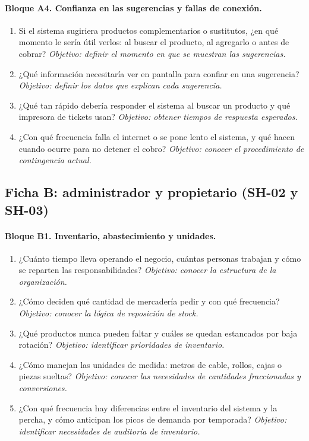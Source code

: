 \paragraph{Bloque A4. Confianza en las sugerencias y fallas de conexión.}
\begin{enumerate}[label=A4.\arabic*, leftmargin=*]
\item Si el sistema sugiriera productos complementarios o sustitutos, ¿en qué momento le sería útil verlos: al buscar el producto, al agregarlo o antes de cobrar? \emph{Objetivo: definir el momento en que se muestran las sugerencias.}
\item ¿Qué información necesitaría ver en pantalla para confiar en una sugerencia? \emph{Objetivo: definir los datos que explican cada sugerencia.}
\item ¿Qué tan rápido debería responder el sistema al buscar un producto y qué impresora de tickets usan? \emph{Objetivo: obtener tiempos de respuesta esperados.}
\item ¿Con qué frecuencia falla el internet o se pone lento el sistema, y qué hacen cuando ocurre para no detener el cobro? \emph{Objetivo: conocer el procedimiento de contingencia actual.}
\end{enumerate}

\subsection*{Ficha B: administrador y propietario (SH-02 y SH-03)}

\paragraph{Bloque B1. Inventario, abastecimiento y unidades.}
\begin{enumerate}[label=B1.\arabic*, leftmargin=*]
\item ¿Cuánto tiempo lleva operando el negocio, cuántas personas trabajan y cómo se reparten las responsabilidades? \emph{Objetivo: conocer la estructura de la organización.}
\item ¿Cómo deciden qué cantidad de mercadería pedir y con qué frecuencia? \emph{Objetivo: conocer la lógica de reposición de stock.}
\item ¿Qué productos nunca pueden faltar y cuáles se quedan estancados por baja rotación? \emph{Objetivo: identificar prioridades de inventario.}
\item ¿Cómo manejan las unidades de medida: metros de cable, rollos, cajas o piezas sueltas? \emph{Objetivo: conocer las necesidades de cantidades fraccionadas y conversiones.}
\item ¿Con qué frecuencia hay diferencias entre el inventario del sistema y la percha, y cómo anticipan los picos de demanda por temporada? \emph{Objetivo: identificar necesidades de auditoría de inventario.}
\end{enumerate}


